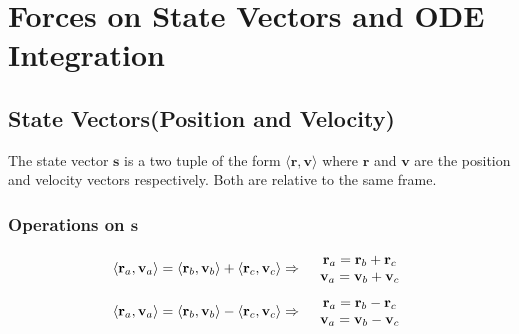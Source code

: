 \section{Forces on State Vectors and ODE Integration}

\subsection{State Vectors(Position and Velocity)}
The state vector $\mathbf{s}$ is a two tuple of the form $\langle \mathbf{r}, \mathbf{v} \rangle$ where $\mathbf{r}$
and $\mathbf{v}$ are the position and velocity vectors respectively. Both are relative to the same frame.


\subsubsection{Operations on $\mathbf{s}$}
\begin{equation}
    \begin{array}{l l}
        \langle \mathbf{r}_a, \mathbf{v}_a \rangle = \langle \mathbf{r}_b, \mathbf{v}_b \rangle + \langle \mathbf{r}_c, \mathbf{v}_c \rangle \Rightarrow &
        \begin{array}{c}
            \mathbf{r}_a = \mathbf{r}_b + \mathbf{r}_c \\
            \mathbf{v}_a = \mathbf{v}_b + \mathbf{v}_c
        \end{array}
    \end{array}
\end{equation}
\begin{equation}
    \begin{array}{l l}
        \langle \mathbf{r}_a, \mathbf{v}_a \rangle = \langle \mathbf{r}_b, \mathbf{v}_b \rangle - \langle \mathbf{r}_c, \mathbf{v}_c \rangle \Rightarrow &
        \begin{array}{c}
            \mathbf{r}_a = \mathbf{r}_b - \mathbf{r}_c \\
            \mathbf{v}_a = \mathbf{v}_b - \mathbf{v}_c
        \end{array}
    \end{array}
\end{equation}


